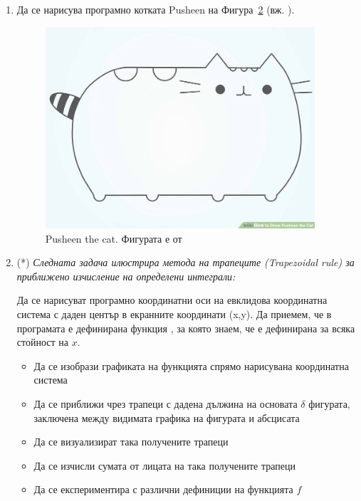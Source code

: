 {\begin{enumerate}[resume]
\begin{figure}
      \caption{Рисуване на петоъгълник чрез намиране на 5 равноотдалечени точки по окръжността с радиус $r$ и център $(x_0,y_0)$}
      \label{fig:pentagon}
    \end{figure}




	\item Да се нарисува програмно котката Pusheen на Фигура~\ref{fig:pusheen} (вж. \cite{pusheen}).

  \begin{figure}
  \centering
	\includegraphics[width=10cm]{images/pusheen}
  \caption {Pusheen the cat. Фигурата е от \cite{pusheen}}
  \label{fig:pusheen}
  \end{figure}


  \item(*) \textit{Следната задача илюстрира метода на трапеците (Trapezoidal rule) за приближено изчисление на определени интеграли:}

	Да се нарисуват програмно координатни оси на евклидова координатна система с даден център в екранните координати (x,y). Да приемем, че в програмата е дефинирана функция , за която знаем, че е дефинирана за всяка стойност на $x$.

	\begin{itemize}
		\item Да се изобрази графиката на функцията спрямо нарисувана координатна система
		\item Да се приближи чрез трапеци с дадена дължина на основата $\delta$ фигурата, заключена между видимата графика на фигурата и абсцисата
		\item Да се визуализират така получените трапеци
		\item Да се изчисли сумата от лицата на така получените трапеци
		\item Да се експериментира с различни дефиниции на функцията $f$
	\end{itemize}


\end{enumerate}}
